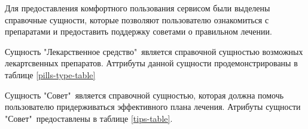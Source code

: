 \documentclass[14pt]{extreport}
\begin{document}
    Для предоставления комфортного пользования сервисом были выделены справочные сущности, %
    которые позволяют пользователю ознакомиться с препаратами и предоставить поддержку советами %
    о правильном лечении.

    Сущность "Лекарственное средство"\ является справочной сущностью возможных %
    лекартсвенных препаратов. Аттрибуты данной сущности продемонстрированы в %
    таблице \ref{pills-type-table}

    \begin{table}[H]
        \caption{Описание атрибутов сущности "Отзыв".}
        \label{comment-table}
    \end{table}

    Сущность "Совет"\ является справочной сущностью, которая должна помочь пользователю %
    придерживаться эффективного плана лечения. Атрибуты сущности "Совет"\ предоставлены в %
    таблице \ref{tips-table}.
    
    \begin{table}[H]
        \caption{Описание атрибутов сущности "Отзыв".}
        \label{tips-table}
    \end{table}
\end{document}
